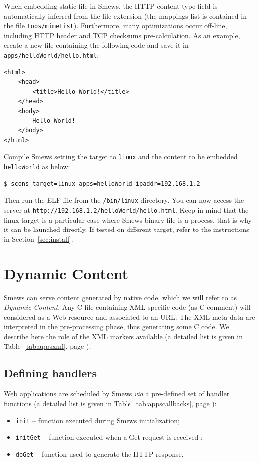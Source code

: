 \documentclass{report}
\newcommand{\rsec}[1]{Section~\ref{sec:#1}}
\newcommand{\rtab}[1]{Table~\ref{tab:#1}}
\begin{document}
When embedding static file in Smews, the HTTP content-type field is automatically inferred from the file extension (the mappings list is contained in the file \texttt{toos/mimeList}). Furthermore, many optimizations occur off-line, including HTTP header and TCP checksums pre-calculation. As an example, create a new file containing the following code and save it in \texttt{apps/helloWorld/hello.html}:

\lstset{language=html}
\begin{lstlisting}
<html>
    <head>
        <title>Hello World!</title>
    </head>
    <body>
        Hello World!
    </body>
</html>
\end{lstlisting}

Compile Smews setting the target to \verb+linux+ and the content to be embedded \verb+helloWorld+ as below:
\begin{verbatim}
$ scons target=linux apps=helloWorld ipaddr=192.168.1.2
\end{verbatim}

Then run the ELF file from the \texttt{/bin/linux} directory. You can now access the server at \verb+http://192.168.1.2/helloWorld/hello.html+. Keep in mind that the linux target is a particular case where Smews binary file is a process, that is why it can be launched directly. If tested on different target, refer to the instructions in \rsec{install}.

\section{Dynamic Content}

Smews can serve content generated by native code, which we will refer to as \textit{Dynamic Content}. Any C file containing XML specific code (as C comment) will considered as a Web resource and associated to an URL. The XML meta-data are interpreted in the pre-processing phase, thus generating some C code. We describe here the role of the XML markers available (a detailed list is given in \rtab{appsxml}, page \pageref{tab:appsxml}).

\subsection{Defining handlers}

Web applications are scheduled by Smews {\it via} a pre-defined set of handler functions (a detailed list is given in \rtab{appscallbacks}, page \pageref{tab:appscallbacks}):
\begin{itemize}
\item \verb+init+ -- function executed during Smews initialization;
\item \verb+initGet+ -- function executed when a Get request is received ;
\item \verb+doGet+ -- function used to generate the HTTP response.
\end{itemize}
\end{document}
